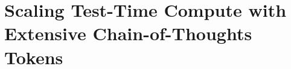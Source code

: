 



\vspace{-1em}

\section{Scaling Test-Time Compute with Extensive Chain-of-Thoughts Tokens}
\label{sec:cot_scale}

